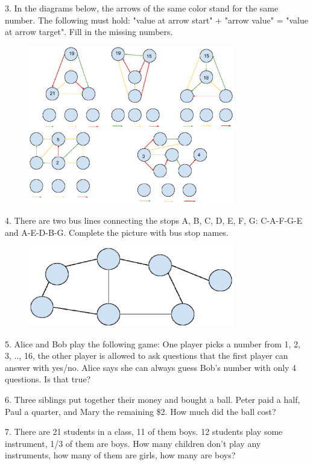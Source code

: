\documentclass{article}
\begin{document}
3. In the diagrams below, the arrows of the same color stand for the same number. The following must hold: "value at arrow start" + "arrow value" = "value at arrow target". Fill in the missing numbers.

\begin{figure}[H]
  \includegraphics[width=0.8\textwidth]{pavuciny.eps}
\end{figure}


\vspace{3mm}

4. There are two bus lines connecting the stops A, B, C, D, E, F, G: C-A-F-G-E and A-E-D-B-G. Complete the picture with bus stop names.

\begin{figure}[H]
  \includegraphics[width=0.8\textwidth]{buses.eps}
\end{figure}


\vspace{3mm}

5. Alice and Bob play the following game: One player picks a number from 1, 2, 3, .., 16, the other player is allowed to ask questions that the first player can answer with yes/no. Alice says she can always guess Bob's number with only 4 questions. Is that true?


\vspace{3mm}

6. Three siblings put together their money and bought a ball. Peter paid a half, Paul a quarter, and Mary the remaining \$2. How much did the ball cost?


\vspace{3mm}

7. There are 21 students in a class, 11 of them boys. 12 students play some instrument, 1/3 of them are boys. How many children don't play any instruments, how many of them are girls, how many are boys?
\end{document}
